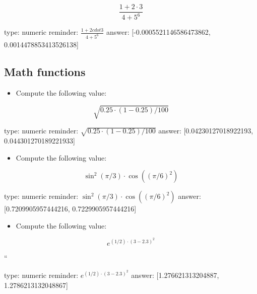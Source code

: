 \documentclass[12pt]{article}
\begin{document}
\[
\frac{1 + 2\cdot 3}{4 + 5^6}
\]

\begin{answer}
    type: numeric
    reminder: \( \frac{1 + 2cdot 3}{4 + 5^6} \)
    answer: [-0.0005521146586473862, 0.0014478853413526138]

\end{answer}

\subsection{Math functions}

\begin{itemize}
\itemsep1pt\parskip0pt
\item
  Compute the following value:
\end{itemize}

\[
\sqrt{0.25\cdot(1-0.25)/100}
\]

\begin{answer}
    type: numeric
    reminder: \( \sqrt{0.25\cdot(1-0.25)/100} \)
    answer: [0.04230127018922193, 0.044301270189221933]

\end{answer}

\begin{itemize}
\itemsep1pt\parskip0pt
\item
  Compute the following value:
\end{itemize}

\[
\sin^2(\pi/3)  \cdot \cos((\pi/6)^2)
\]

\begin{answer}
    type: numeric
    reminder: \( \sin^2(\pi/3)  \cdot \cos((\pi/6)^2) \)
    answer: [0.7209905957444216, 0.7229905957444216]

\end{answer}

\begin{itemize}
\itemsep1pt\parskip0pt
\item
  Compute the following value:
\end{itemize}

\[
e^{(1/2)\cdot(3 - 2.3)^2}
\]

``

\begin{answer}
    type: numeric
    reminder: \( e^{(1/2)\cdot(3 - 2.3)^2} \)
    answer: [1.276621313204887, 1.2786213132048867]

\end{answer}
\end{document}
